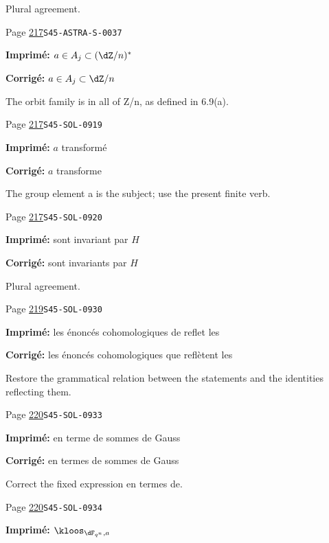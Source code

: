 \begin{description}
\par\noindent Plural agreement.
\smallskip
\item[\hypertarget{apparatus:FR-0228}{228}] Page \hyperlink{printpage:fr:217}{217}\quad\texttt{S45-ASTRA-S-0037}
\par\noindent\textbf{Imprimé:} $a\in A_j\subset (\dZ/n)^\ast$
\par\noindent\textbf{Corrigé:} $a\in A_j\subset\dZ/n$
\par\noindent The orbit family is in all of Z/n, as defined in 6.9(a).
\smallskip
\item[\hypertarget{apparatus:FR-0229}{229}] Page \hyperlink{printpage:fr:217}{217}\quad\texttt{S45-SOL-0919}
\par\noindent\textbf{Imprimé:} $a$ transformé
\par\noindent\textbf{Corrigé:} $a$ transforme
\par\noindent The group element a is the subject; use the present finite verb.
\smallskip
\item[\hypertarget{apparatus:FR-0230}{230}] Page \hyperlink{printpage:fr:217}{217}\quad\texttt{S45-SOL-0920}
\par\noindent\textbf{Imprimé:} sont invariant par $H$
\par\noindent\textbf{Corrigé:} sont invariants par $H$
\par\noindent Plural agreement.
\smallskip
\item[\hypertarget{apparatus:FR-0231}{231}] Page \hyperlink{printpage:fr:219}{219}\quad\texttt{S45-SOL-0930}
\par\noindent\textbf{Imprimé:} les énoncés cohomologiques de reflet les
\par\noindent\textbf{Corrigé:} les énoncés cohomologiques que reflètent les
\par\noindent Restore the grammatical relation between the statements and the identities reflecting them.
\smallskip
\item[\hypertarget{apparatus:FR-0232}{232}] Page \hyperlink{printpage:fr:220}{220}\quad\texttt{S45-SOL-0933}
\par\noindent\textbf{Imprimé:} en terme de sommes de Gauss
\par\noindent\textbf{Corrigé:} en termes de sommes de Gauss
\par\noindent Correct the fixed expression en termes de.
\smallskip
\item[\hypertarget{apparatus:FR-0233}{233}] Page \hyperlink{printpage:fr:220}{220}\quad\texttt{S45-SOL-0934}
\par\noindent\textbf{Imprimé:} \(\kloos_{\dF_{q^n},a}\)

\end{description}
